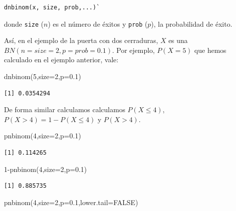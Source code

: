 \documentclass[
  letterpaper,
  DIV=11,
  numbers=noendperiod]{scrreprt}
\newenvironment{Shaded}{\begin{snugshade}}{\end{snugshade}}
\newcommand{\AttributeTok}[1]{\textcolor[rgb]{0.40,0.45,0.13}{#1}}
\newcommand{\ConstantTok}[1]{\textcolor[rgb]{0.56,0.35,0.01}{#1}}
\newcommand{\DecValTok}[1]{\textcolor[rgb]{0.68,0.00,0.00}{#1}}
\newcommand{\FloatTok}[1]{\textcolor[rgb]{0.68,0.00,0.00}{#1}}
\newcommand{\FunctionTok}[1]{\textcolor[rgb]{0.28,0.35,0.67}{#1}}
\newcommand{\NormalTok}[1]{\textcolor[rgb]{0.00,0.23,0.31}{#1}}
\newcommand{\SpecialCharTok}[1]{\textcolor[rgb]{0.37,0.37,0.37}{#1}}
\begin{document}
\begin{verbatim}
dnbinom(x, size, prob,...)`
\end{verbatim}

donde \texttt{size} (\(n\)) es el número de éxitos y \texttt{prob}
(\(p\)), la probabilidad de éxito.

Así, en el ejemplo de la puerta con dos cerraduras, \(X\) es una
\(BN(n=size=2,p=prob=0.1)\). Por ejemplo, \(P(X=5)\) que hemos calculado
en el ejemplo anterior, vale:

\begin{Shaded}
\begin{Highlighting}[]
\FunctionTok{dnbinom}\NormalTok{(}\DecValTok{5}\NormalTok{,}\AttributeTok{size=}\DecValTok{2}\NormalTok{,}\AttributeTok{p=}\FloatTok{0.1}\NormalTok{)}
\end{Highlighting}
\end{Shaded}

\begin{verbatim}
[1] 0.0354294
\end{verbatim}

De forma similar calculamos calculamos \(P(X\leq 4)\),
\(P(X>4)=1-P(X\leq 4)\) y \(P(X>4)\).

\begin{Shaded}
\begin{Highlighting}[]
\FunctionTok{pnbinom}\NormalTok{(}\DecValTok{4}\NormalTok{,}\AttributeTok{size=}\DecValTok{2}\NormalTok{,}\AttributeTok{p=}\FloatTok{0.1}\NormalTok{)}
\end{Highlighting}
\end{Shaded}

\begin{verbatim}
[1] 0.114265
\end{verbatim}

\begin{Shaded}
\begin{Highlighting}[]
\DecValTok{1}\SpecialCharTok{{-}}\FunctionTok{pnbinom}\NormalTok{(}\DecValTok{4}\NormalTok{,}\AttributeTok{size=}\DecValTok{2}\NormalTok{,}\AttributeTok{p=}\FloatTok{0.1}\NormalTok{)}
\end{Highlighting}
\end{Shaded}

\begin{verbatim}
[1] 0.885735
\end{verbatim}

\begin{Shaded}
\begin{Highlighting}[]
\FunctionTok{pnbinom}\NormalTok{(}\DecValTok{4}\NormalTok{,}\AttributeTok{size=}\DecValTok{2}\NormalTok{,}\AttributeTok{p=}\FloatTok{0.1}\NormalTok{,}\AttributeTok{lower.tail=}\ConstantTok{FALSE}\NormalTok{)}
\end{Highlighting}
\end{Shaded}
\end{document}
